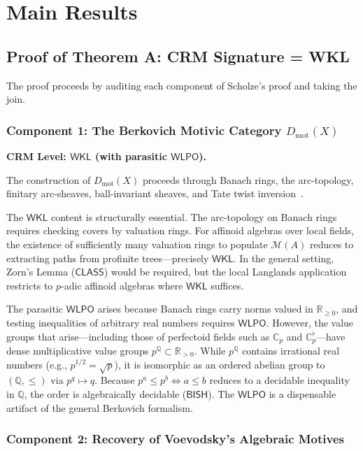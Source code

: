 \documentclass[11pt,a4paper]{article}
\theoremstyle{plain}
\theoremstyle{definition}
\newcommand{\BISH}{\textsf{BISH}}
\newcommand{\WKL}{\textsf{WKL}}
\newcommand{\WLPO}{\textsf{WLPO}}
\newcommand{\CLASS}{\textsf{CLASS}}
\newcommand{\Dmot}{D_{\mathrm{mot}}}
\newcommand{\Q}{\mathbb{Q}}
\newcommand{\R}{\mathbb{R}}
\newcommand{\C}{\mathbb{C}}
\begin{document}
\section{Main Results}\label{sec:main}

\subsection{Proof of Theorem A: CRM Signature = WKL}\label{sec:thmA}

The proof proceeds by auditing each component of Scholze's proof and taking the join.

\subsubsection{Component 1: The Berkovich Motivic Category $\Dmot(X)$}\label{sec:dmot}

\textbf{CRM Level: $\WKL$ (with parasitic $\WLPO$).}

The construction of $\Dmot(X)$ proceeds through Banach rings, the arc-topology, finitary arc-sheaves, ball-invariant sheaves, and Tate twist inversion~\cite{scholze-berkovich}.

The $\WKL$ content is structurally essential. The arc-topology on Banach rings requires checking covers by valuation rings. For affinoid algebras over local fields, the existence of sufficiently many valuation rings to populate $\mathcal{M}(A)$ reduces to extracting paths from profinite trees---precisely $\WKL$. In the general setting, Zorn's Lemma ($\CLASS$) would be required, but the local Langlands application restricts to $p$-adic affinoid algebras where $\WKL$ suffices.

The parasitic $\WLPO$ arises because Banach rings carry norms valued in $\R_{\geq 0}$, and testing inequalities of arbitrary real numbers requires $\WLPO$. However, the value groups that arise---including those of perfectoid fields such as $\C_p$ and $\C_p^\flat$---have dense multiplicative value groups $p^{\Q} \subset \R_{>0}$. While $p^{\Q}$ contains irrational real numbers (e.g., $p^{1/2} = \sqrt{p}$), it is isomorphic as an ordered abelian group to $(\Q, \leq)$ via $p^q \mapsto q$. Because $p^a \leq p^b \iff a \leq b$ reduces to a decidable inequality in $\Q$, the order is algebraically decidable ($\BISH$). The $\WLPO$ is a dispensable artifact of the general Berkovich formalism.

\subsubsection{Component 2: Recovery of Voevodsky's Algebraic Motives}
\end{document}
